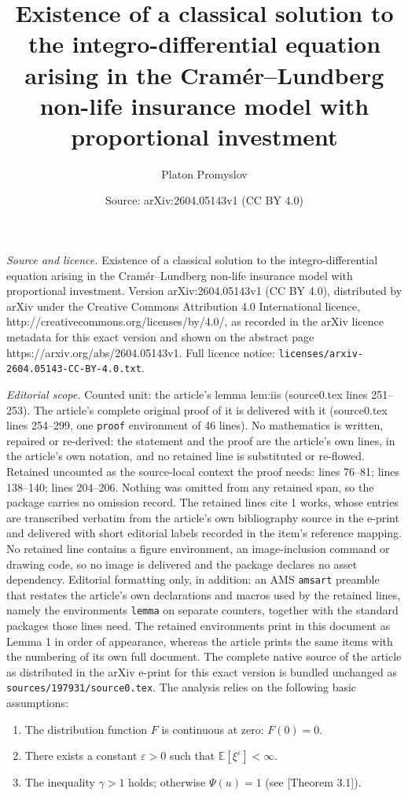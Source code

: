 \documentclass[10pt,a4paper]{amsart}
\title{Existence of a classical solution to the integro-differential equation arising in the Cram\'er--Lundberg non-life insurance model with proportional investment}
\author{Platon Promyslov}
\date{Source: arXiv:2604.05143v1 (CC BY 4.0)}
\newcommand{\bbe}{\mathbb{E}}
\newcommand{\eps}{\varepsilon}
\begin{document}
\maketitle

\noindent\emph{Source and licence.} Existence of a classical solution to the integro-differential equation arising in the Cram\'er--Lundberg non-life insurance model with proportional investment. Version arXiv:2604.05143v1 (CC BY 4.0), distributed by arXiv under the Creative Commons Attribution 4.0 International licence, http://creativecommons.org/licenses/by/4.0/, as recorded in the arXiv licence metadata for this exact version and shown on the abstract page https://arxiv.org/abs/2604.05143v1. Full licence notice: \texttt{licenses/arxiv-2604.05143-CC-BY-4.0.txt}.\par\smallskip

\noindent\textit{Editorial scope.} Counted unit: the article's lemma lem:iis (source0.tex lines 251--253). The article's complete original proof of it is delivered with it (source0.tex lines 254--299, one \texttt{proof} environment of 46 lines). No mathematics is written, repaired or re-derived: the statement and the proof are the article's own lines, in the article's own notation, and no retained line is substituted or re-flowed.  Retained uncounted as the source-local context the proof needs: lines 76--81; lines 138--140; lines 204--206.  Nothing was omitted from any retained span, so the package carries no omission record.  The retained lines cite 1 works, whose entries are transcribed verbatim from the article's own bibliography source in the e-print and delivered with short editorial labels recorded in the item's reference mapping.  No retained line contains a figure environment, an image-inclusion command or drawing code, so no image is delivered and the package declares no asset dependency.  Editorial formatting only, in addition: an AMS \texttt{amsart} preamble that restates the article's own declarations and macros used by the retained lines, namely the environments \texttt{lemma} on separate counters, together with the standard packages those lines need.  The retained environments print in this document as Lemma 1 in order of appearance, whereas the article prints the same items with the numbering of its own full document.  The complete native source of the article as distributed in the arXiv e-print for this exact version is bundled unchanged as \texttt{sources/197931/source0.tex}.
The analysis relies on the following basic assumptions:
\begin{enumerate}[label=(\textbf{A\arabic*})]
    \item \label{assump:1} The distribution function $F$ is continuous at zero: $F(0)=0$.
    \item \label{assump:2} There exists a constant $\eps > 0$ such that $\bbe[\xi^\eps] < \infty$.
    \item \label{assump:3} The inequality $\gamma > 1$ holds; otherwise $\Psi(u) = 1$ (see \cite{Paulsen1993}[Theorem 3.1]).
\end{enumerate}
\end{document}

